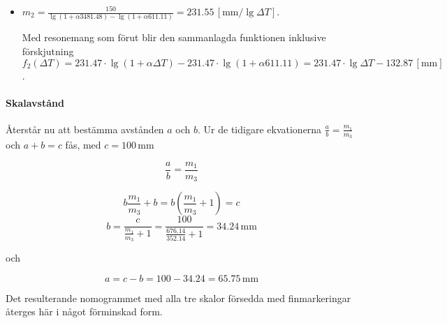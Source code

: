 \documentclass[oneside,11pt,a4paper,swedish]{scrbook}
\begin{document}
\begin{itemize}
\begin{itemize}
\item 
$m_2= \frac{150}{\lg (1+\alpha 3481.48) - \lg (1+ \alpha 611.11)}=231.55 \,[\textrm{mm}/\lg \Delta T]$.

Med resonemang som förut blir den sammanlagda funktionen inklusive förskjutning  \[f_2(\Delta T)=231.47\cdot \lg (1+\alpha \Delta T) - 231.47\cdot \lg (1+ \alpha 611.11)=231.47\cdot \lg \Delta T -132.87 \,[\textrm{mm}]\].
\end{itemize}



\end{itemize}

\paragraph{Skalavstånd} Återstår nu att bestämma avstånden $a$ och $b$. Ur de tidigare ekvationerna $\frac{a}{b}= \frac{m_1}{m_3}$ och $a+b =c$ fås, med $c=100\,\textrm{mm}$ 

\[ \frac{a}{b}= \frac{m_1}{m_3}\]

\[ b\frac{m_1}{m_3}+b = b(\frac{m_1}{m_3}+1)=c\] \[ b = \frac{c}{\frac{m_1}{m_3}+1} =  \frac{100}{\frac{676.14}{352.14}+1}=34.24\,\textrm{mm}\]

och

\[ a = c - b = 100 - 34.24= 65.75\,\textrm{mm} \]

Det resulterande nomogrammet med alla tre skalor försedda med finmarkeringar återges här i något förminskad form.
\end{document}
